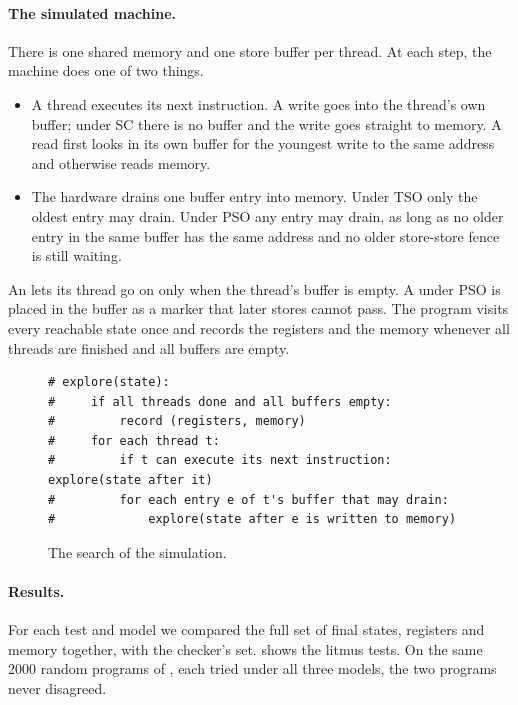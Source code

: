 \paragraph{The simulated machine.} There is one shared memory and one store buffer per thread. At each step, the machine does one of two things.
\begin{itemize}
\item A thread executes its next instruction. A write goes into the thread's own buffer; under SC there is no buffer and the write goes straight to memory. A read first looks in its own buffer for the youngest write to the same address and otherwise reads memory.
\item The hardware drains one buffer entry into memory. Under TSO only the oldest entry may drain. Under PSO any entry may drain, as long as no older entry in the same buffer has the same address and no older store-store fence is still waiting.
\end{itemize}
An  lets its thread go on only when the thread's buffer is empty. A  under PSO is placed in the buffer as a marker that later stores cannot pass. The program visits every reachable state once and records the registers and the memory whenever all threads are finished and all buffers are empty.

\begin{figure}[!htbp]
\centering
\begin{lstlisting}[style=vscode,language=Pseudo]
# explore(state):
#     if all threads done and all buffers empty:
#         record (registers, memory)
#     for each thread t:
#         if t can execute its next instruction:  explore(state after it)
#         for each entry e of t's buffer that may drain:
#             explore(state after e is written to memory)
\end{lstlisting}
\caption{The search of the simulation.}
\label{fig:explore}
\end{figure}

\paragraph{Results.} For each test and model we compared the full set of final states, registers and memory together, with the checker's set.  shows the litmus tests. On the same 2000 random programs of , each tried under all three models, the two programs never disagreed.

